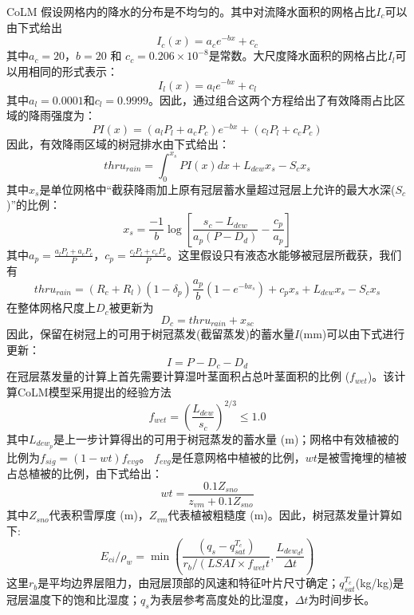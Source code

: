 CoLM 假设网格内的降水的分布是不均匀的。其中对流降水面积的网格占比$I_c$可以由下式给出
\begin{equation}
I_{c}(x)=a_{c} e^{-b x}+c_{c}
\end{equation}
其中$a_c=20$，$b=20$ 和 $c_c=0.206\times10^{-8}$是常数。大尺度降水面积的网格占比$I_l$可以用相同的形式表示：
\begin{equation}
I_{l}(x)=a_{l} e^{-b x}+c_{l}
\end{equation}
其中$a_l=0.0001$和$c_l=0.9999$。因此，通过组合这两个方程给出了有效降雨占比区域的降雨强度为：
\begin{equation}
P I(x)=\left(a_{l} P_{l}+a_{c} P_{c}\right) e^{-b x}+\left(c_{l} P_{l}+c_{c} P_{c}\right)
\end{equation}
因此，有效降雨区域的树冠排水由下式给出：
\begin{equation}
t h r u_{ {rain }}=\int_{0}^{x_{s}} P I(x) d x+L_{d e w} x_{s}-S_{c} x_{s}
\end{equation}
其中$x_s$是单位网格中“截获降雨加上原有冠层蓄水量超过冠层上允许的最大水深($S_c$)”的比例：
\begin{equation}
x_{s}=\frac{-1}{b} \log \left[\frac{s_{c}-L_{d e w}}{a_{p}\left(P-D_{d}\right)}-\frac{c_{p}}{a_{p}}\right]
\end{equation}
其中$a_p=\frac{a_lP_l+a_cP_c}{P}$，$c_p=\frac{c_lP_l+c_cP_c}{P}$。这里假设只有液态水能够被冠层所截获，我们有
\begin{equation}
t h r u_{ {rain }}=\left(R_{c}+R_{l}\right)\left(1-\delta_{p}\right) \frac{a_{p}}{b}\left(1-e^{-b x_{s}}\right)+c_{p} x_{s}+L_{d e w} x_{s}-S_{c} x_{s}
\end{equation}
在整体网格尺度上$D_c$被更新为
\begin{equation}
D_c=thru_{r a i n}+x_{s c}
\end{equation}
因此，保留在树冠上的可用于树冠蒸发(截留蒸发)的蓄水量$I$(mm)可以由下式进行更新：
\begin{equation}
I={P}-D_{c}-D_{d}
\end{equation}
在冠层蒸发量的计算上首先需要计算湿叶茎面积占总叶茎面积的比例 ($f_{wet}$)。该计算CoLM模型采用\citet{dickinson1993biosphere}提出的经验方法
\begin{equation}
f_{{wet}}=\left(\frac{L_{d e w}}{s_{c}}\right)^{2 / 3} \leq 1.0
\end{equation}
其中$L_{dew_p}$是上一步计算得出的可用于树冠蒸发的蓄水量 (m)；网格中有效植被的比例为$f_{sig}=\left(1-wt\right)f_{evg}$。
$f_{evg}$是任意网格中植被的比例，$wt$是被雪掩埋的植被占总植被的比例，由下式给出：
\begin{equation}
w t=\frac{0.1 Z_{sno}}{z_{vm}+0.1 Z_{sno}}
\end{equation}
其中$Z_{sno}$代表积雪厚度 (m)，$Z_{vm}$代表植被粗糙度 (m)。因此，树冠蒸发量计算如下:
\begin{equation}
E_{c i} / \rho_{w}=\min \left(\frac{\left(q_{s}-q_{sat}^{T_{c}}\right)}{r_{b} /\left(LSAI \times f_{w e t} t\right.}, \frac{L_{d e w_{d} t}}{\Delta t}\right)
\end{equation}
这里$r_b$是平均边界层阻力，由冠层顶部的风速和特征叶片尺寸确定；$q_{sat}^{T_c} $(kg/kg)是冠层温度下的饱和比湿度；$q_s$为表层参考高度处的比湿度，$\Delta t$为时间步长。


